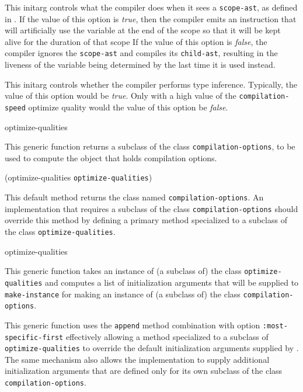 
This initarg controls what the compiler does when it sees a
\texttt{scope-ast}, as defined in .  If the
value of this option is \emph{true}, then the compiler emits
an instruction that will artificially use the variable at the end of
the scope so that it will be kept alive for the duration of that scope
If the value of this option is \emph{false}, the compiler ignores the
\texttt{scope-ast} and compiles its \texttt{child-ast}, resulting in
the liveness of the variable being determined by the last time it is
used instead.


This initarg controls whether the compiler performs type inference.
Typically, the value of this option would be \emph{true}.  Only with a
high value of the \texttt{compilation-speed} optimize quality would
the value of this option be \emph{false}.

 {optimize-qualities}

This generic function returns a subclass of the class
\texttt{compilation-options}, to be used to compute the object that
holds compilation options.

{(optimize-qualities \texttt{optimize-qualities})}

This default method returns the class named
\texttt{compilation-options}.  An implementation that requires a
subclass of the class \texttt{compilation-options} should override
this method by defining a primary method specialized to a subclass of
the class \texttt{optimize-qualities}.

 {optimize-qualities}

This generic function takes an instance of (a subclass of) the class
\texttt{optimize-qualities} and computes a list of initialization
arguments that will be supplied to \texttt{make-instance} for making
an instance of (a subclass of) the class \texttt{compilation-options}.

This generic function uses the \texttt{append} method combination with
option \texttt{:most-specific-first} effectively allowing a method
specialized to a subclass of \texttt{optimize-qualities} to override
the default initialization arguments supplied by \sysname{}.  The same
mechanism also allows the implementation to supply additional
initialization arguments that are defined only for its own subclass of
the class \texttt{compilation-options}.
